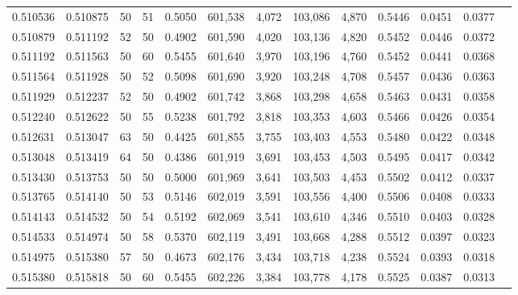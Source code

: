 \begin{tabular}{rrrrrrrrrrrrr}
0.510536 & 0.510875 &    50 &  51 &                                     0.5050 & 601,538 &   4,072 & 103,086 &   4,870 & 0.5446 & 0.0451 & 0.0377 \\
0.510879 & 0.511192 &    52 &  50 &                                     0.4902 & 601,590 &   4,020 & 103,136 &   4,820 & 0.5452 & 0.0446 & 0.0372 \\
0.511192 & 0.511563 &    50 &  60 &                                     0.5455 & 601,640 &   3,970 & 103,196 &   4,760 & 0.5452 & 0.0441 & 0.0368 \\
0.511564 & 0.511928 &    50 &  52 &                                     0.5098 & 601,690 &   3,920 & 103,248 &   4,708 & 0.5457 & 0.0436 & 0.0363 \\
0.511929 & 0.512237 &    52 &  50 &                                     0.4902 & 601,742 &   3,868 & 103,298 &   4,658 & 0.5463 & 0.0431 & 0.0358 \\
0.512240 & 0.512622 &    50 &  55 &                                     0.5238 & 601,792 &   3,818 & 103,353 &   4,603 & 0.5466 & 0.0426 & 0.0354 \\
0.512631 & 0.513047 &    63 &  50 &                                     0.4425 & 601,855 &   3,755 & 103,403 &   4,553 & 0.5480 & 0.0422 & 0.0348 \\
0.513048 & 0.513419 &    64 &  50 &                                     0.4386 & 601,919 &   3,691 & 103,453 &   4,503 & 0.5495 & 0.0417 & 0.0342 \\
0.513430 & 0.513753 &    50 &  50 &                                     0.5000 & 601,969 &   3,641 & 103,503 &   4,453 & 0.5502 & 0.0412 & 0.0337 \\
0.513765 & 0.514140 &    50 &  53 &                                     0.5146 & 602,019 &   3,591 & 103,556 &   4,400 & 0.5506 & 0.0408 & 0.0333 \\
0.514143 & 0.514532 &    50 &  54 &                                     0.5192 & 602,069 &   3,541 & 103,610 &   4,346 & 0.5510 & 0.0403 & 0.0328 \\
0.514533 & 0.514974 &    50 &  58 &                                     0.5370 & 602,119 &   3,491 & 103,668 &   4,288 & 0.5512 & 0.0397 & 0.0323 \\
0.514975 & 0.515380 &    57 &  50 &                                     0.4673 & 602,176 &   3,434 & 103,718 &   4,238 & 0.5524 & 0.0393 & 0.0318 \\
0.515380 & 0.515818 &    50 &  60 &                                     0.5455 & 602,226 &   3,384 & 103,778 &   4,178 & 0.5525 & 0.0387 & 0.0313 \\

\end{tabular}
